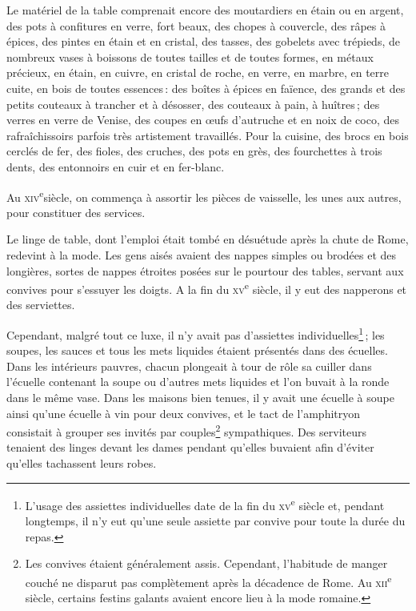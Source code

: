 Le matériel de la table comprenait encore des moutardiers en étain ou en
argent, des pots à confitures en verre, fort beaux, des chopes à couvercle, des
râpes à épices, des pintes en étain et en cristal, des tasses, des gobelets
avec trépieds, de nombreux vases à boissons de toutes tailles et de toutes
formes, en métaux précieux, en étain, en cuivre, en cristal de roche, en verre,
en marbre, en terre cuite, en bois de toutes essences : des boîtes à épices en
faïence, des grands et des petits couteaux à trancher et à désosser, des
couteaux à pain, à huîtres ; des verres en verre de Venise, des coupes en œufs
d'autruche et en noix de coco, des rafraîchissoirs parfois très artistement
travaillés. Pour la cuisine, des brocs en bois cerclés de fer, des fioles, des
cruches, des pots en grès, des fourchettes à trois dents, des entonnoirs en
cuir et en fer-blanc.

Au \textsc{xiv}\textsuperscript{e}siècle, on commença à assortir les pièces de
vaisselle, les unes aux autres, pour constituer des services.

Le linge de table, dont l'emploi était tombé en désuétude après la chute de
Rome, redevint à la mode. Les gens aisés avaient des nappes simples ou brodées
et des longières, sortes de nappes étroites posées sur le pourtour des tables,
servant aux convives pour s'essuyer les doigts. A la fin du
\textsc{xv}\textsuperscript{e} siècle, il y eut des napperons et des
serviettes.

Cependant, malgré tout ce luxe, il n'y avait pas d’assiettes
individuelles\footnote{L'usage des assiettes individuelles date de la fin du
\textsc{xv}\textsuperscript{e} siècle et, pendant longtemps, il n'y eut qu'une
seule assiette par convive pour toute la durée du repas.} ; les soupes, les
sauces et tous les mets liquides étaient présentés dans des écuelles. Dans les
intérieurs pauvres, chacun plongeait à tour de rôle sa cuiller dans l'écuelle
contenant la soupe ou d'autres mets liquides et l'on buvait à la ronde dans le
même vase. Dans les maisons bien tenues, il y avait une écuelle à soupe ainsi
qu'une écuelle à vin pour deux convives, et le tact de l'amphitryon consistait
à grouper ses invités par couples\footnote{Les convives étaient généralement
assis. Cependant, l'habitude de manger couché ne disparut pas complètement
après la décadence de Rome. Au \textsc{xii}\textsuperscript{e} siècle, certains
festins galants avaient encore lieu à la mode romaine.} sympathiques. Des
serviteurs tenaient des linges devant les dames pendant qu'elles buvaient afin
d'éviter qu'elles tachassent leurs robes.

